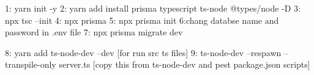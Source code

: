 1: yarn init -y
2: yarn add install prisma typescript ts-node @types/node -D
3: npx tsc --init
4: npx prisma
5: npx prisma init
6:chang databse name and password in .env file 
7: npx prisma migrate dev


8: yarn add ts-node-dev --dev [for run src ts files]
9: ts-node-dev --respawn --transpile-only server.ts [copy this from ts-node-dev and pest package.json scripts]